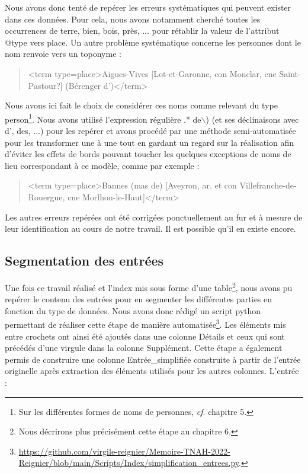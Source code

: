 \documentclass[a4paper,12pt,twoside]{book}
\begin{document}
	\noindent Nous avons donc tenté de repérer les erreurs systématiques qui peuvent exister dans ces données. Pour cela, nous avons notamment cherché toutes les occurrences de \og terre\fg{}, \og bien\fg{}, \og bois\fg{}, \og près\fg{}, ... pour rétablir la valeur de l'attribut @type vers \og place\fg{}. Un autre problème systématique concerne les personnes dont le nom renvoie vers un toponyme :
	
	\begin{quotation}
		<term type=\textquotesingle place\textquotesingle >Aigues-Vives [Lot-et-Garonne, con Monclar, cne Saint-Pastour?]
			(Bérenger d')</term>
	\end{quotation}

	\noindent Nous avons ici fait le choix de considérer ces noms comme relevant du type \og person\fg{}\footnote{Sur les différentes formes de noms de personnes, \textit{cf}. chapitre 5.}. Nous avons utilisé l'expression régulière \og [A-Z].* de$\backslash$)\fg{} (et ses déclinaisons avec \og d'\fg{}, \og des\fg{}, ...) pour les repérer et avons procédé par une méthode semi-automatisée pour les transformer une à une tout en gardant un regard sur la réalisation afin d'éviter les effets de bords pouvant toucher les quelques exceptions de noms de lieu correspondant à ce modèle, comme par exemple :
	
	\begin{quotation}
    	<term type=\textquotesingle place\textquotesingle >Bannes (mas de) [Aveyron, ar. et con Villefranche-de-Rouergue,
			cne Morlhon-le-Haut]</term>
	\end{quotation}
	
	\noindent Les autres erreurs repérées ont été corrigées ponctuellement au fur et à mesure de leur identification au cours de notre travail. Il est possible qu'il en existe encore.
	
	\subsection{Segmentation des entrées}
	
	Une fois ce travail réalisé et l'index mis sous forme d'une table\footnote{Nous décrirons plus précisément cette étape au chapitre 6.}, nous avons pu repérer le contenu des entrées pour en segmenter les différentes parties en fonction du type de données. Nous avons donc rédigé un script python permettant de réaliser cette étape de manière automatisée\footnote{\url{https://github.com/virgile-reignier/Memoire-TNAH-2022-Reignier/blob/main/Scripts/Index/simplification_entrees.py}.}. Les éléments mis entre crochets ont ainsi été ajoutés dans une colonne \og Détails\fg{} et ceux qui sont précédés d'une virgule dans la colonne \og Supplément\fg{}. Cette étape a également permis de construire une colonne \og Entrée\_simplifiée\fg{} construite à partir de l'entrée originelle après extraction des éléments utilisés pour les autres colonnes. L'entrée :
	
\end{document}
